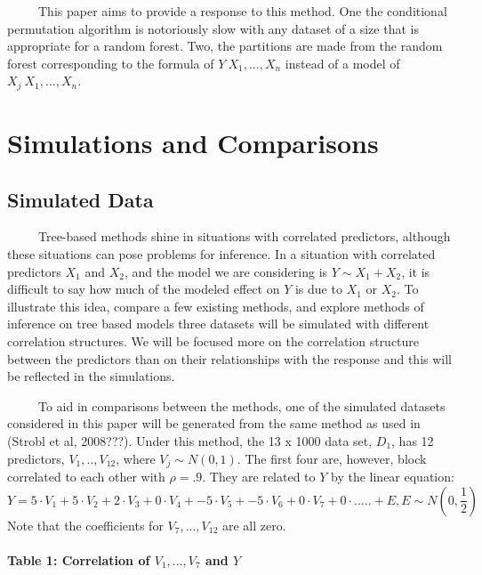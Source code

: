 \documentclass[12pt,twoside]{reedthesis}
\begin{document}
  ~~~~~This paper aims to provide a response to this method. One the
  conditional permutation algorithm is notoriously slow with any dataset
  of a size that is appropriate for a random forest. Two, the partitions
  are made from the random forest corresponding to the formula of
  \(Y~X_1,...,X_n\) instead of a model of \(X_j~X_1,...,X_n\).
  
  \chapter{Simulations and Comparisons}\label{simulations-and-comparisons}
  
  \section{Simulated Data}\label{simulated-data}
  
  ~~~~~Tree-based methods shine in situations with correlated predictors,
  although these situations can pose problems for inference. In a
  situation with correlated predictors \(X_1\) and \(X_2\), and the model
  we are considering is \(Y \sim X_1 + X_2\), it is difficult to say how
  much of the modeled effect on \(Y\) is due to \(X_1\) or \(X_2\). To
  illustrate this idea, compare a few existing methods, and explore
  methods of inference on tree based models three datasets will be
  simulated with different correlation structures. We will be focused more
  on the correlation structure between the predictors than on their
  relationships with the response and this will be reflected in the
  simulations.
  
  ~~~~~To aid in comparisons between the methods, one of the simulated
  datasets considered in this paper will be generated from the same method
  as used in (Strobl et al, 2008???). Under this method, the 13 x 1000
  data set, \(D_1\), has 12 predictors, \(V_1,..,V_{12}\), where
  \(V_j \sim N(0,1)\). The first four are, however, block correlated to
  each other with \(\rho = .9\). They are related to \(Y\) by the linear
  equation:
  \[Y = 5 \cdot V_1 + 5 \cdot V_2 + 2 \cdot V_3 + 0 \cdot V_4 + -5 \cdot V_5 + -5\cdot V_6 + 0\cdot V_7 + 0 \cdot ..... + E, E \sim N(0,\frac 1 2 )\]
  Note that the coefficients for \(V_7,...,V_{12}\) are all zero.
  
  \subsubsection{\texorpdfstring{Table 1: Correlation of \(V_1,..., V_7\)
  and
  \(Y\)}{Table 1: Correlation of V\_1,..., V\_7 and Y}}\label{table-1-correlation-of-v_1...-v_7-and-y}
  
\end{document}

